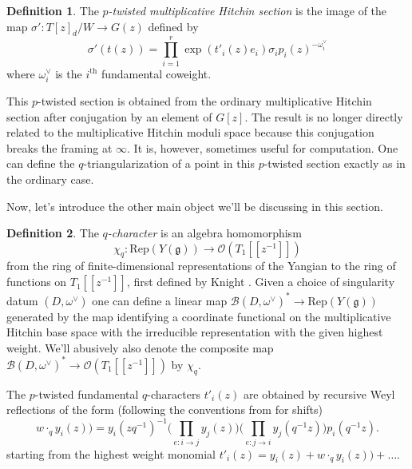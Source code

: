\documentclass[11pt, oneside, reqno]{amsart}
\theoremstyle{definition} \newtheorem{definition}{Definition}[section]
\theoremstyle{definition} \newtheorem{remark}[definition]{Remark}
\theoremstyle{definition} \newtheorem{remarks}[definition]{Remarks}
\theoremstyle{definition} \newtheorem{question}[definition]{Question}
\theoremstyle{definition} \newtheorem*{note}{Note}
\theoremstyle{definition} \newtheorem{example}[definition]{Example}
\theoremstyle{definition} \newtheorem{examples}[definition]{Examples}
\renewcommand{\gg}{\mathfrak{g}}
\newcommand{\mr}[1]{\mathrm{#1}}
\newcommand{\mc}[1]{\mathcal{#1}}
\newcommand{\OO}{\mathcal{O}}
\begin{document}
\begin{definition}
The \emph{$p$-twisted multiplicative Hitchin section} is the image of the map $\sigma' \colon T[z]_d/W \to G(z)$ defined by
\begin{equation}
\label{eq:steinberg}
\sigma'(t(z)) = \prod_{i=1}^r \exp\left(t'_{i}(z) e_i\right) \sigma_i p_i(z)^{-\omega^\vee_i}
\end{equation}
where $\omega^\vee_i$ is the $i^\text{th}$ fundamental coweight.
\end{definition}

This $p$-twisted section is obtained from the ordinary multiplicative Hitchin section after conjugation by an element of $G[z]$.  The result is no longer directly related to the multiplicative Hitchin moduli space because this conjugation breaks the framing at $\infty$.  It is, however, sometimes useful for computation. One can define the $q$-triangularization of a point in this $p$-twisted section exactly as in the ordinary case.

Now, let's introduce the other main object we'll be discussing in this section.
 
\begin{definition}
The \emph{$q$-character} is an algebra homomorphism 
\[\chi_q \colon \mr{Rep}(Y(\gg)) \to \OO(T_1[[z^{-1}]])\]
from the ring of finite-dimensional representations of the Yangian to the ring of functions on $T_1[[z^{-1}]]$, first defined by Knight \cite{Knight}.  Given a choice of singularity datum $(D,\omega^\vee)$ one can define a linear map $\mc B(D, \omega^\vee)^* \to \mr{Rep}(Y(\gg))$ generated by the map identifying a coordinate functional on the multiplicative Hitchin base space with the irreducible representation with the given highest weight.  We'll abusively also denote the composite map $\mc B(D, \omega^\vee)^* \to \OO(T_1[[z^{-1}]])$ by $\chi_q$.
\end{definition}

The $p$-twisted fundamental $q$-characters $t'_i(z)$ are obtained by recursive Weyl reflections of the form \cite{NekrasovPestun,NekrasovPestunShatashvili,Nekrasov:2015wsu} (following the conventions from \cite{Kimura:2015rgi} for shifts)
\begin{equation}
  w \cdot_q y_i(z)) = y_{i}(z q^{-1})^{-1} \Bigg(\prod_{e: i \to j} y_j(z) \Bigg) \Bigg(\prod_{e: j\to i} y_j(q^{-1} z)\Bigg)  p_{i}( q^{-1} z).
  \label{iWeyl_action}
\end{equation}
starting from the highest weight monomial $t'_i(z) = y_i(z) +  w \cdot_q y_i(z)) + \dots $. 
\end{document}
